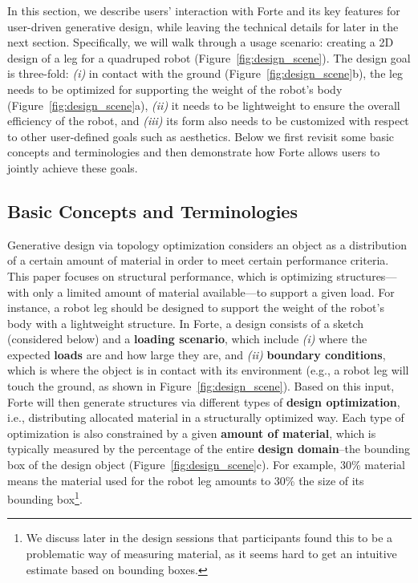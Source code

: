 In this section, we describe users' interaction with Forte and its key features for user-driven generative design, while leaving the technical details for later in the next section. Specifically, we will walk through a usage scenario: creating a 2D design of a leg for a quadruped robot (Figure~\ref{fig:design_scene}). The design goal is three-fold: {\em (i)} in contact with the ground (Figure~\ref{fig:design_scene}b), the leg needs to be optimized for supporting the weight of the robot's body (Figure~\ref{fig:design_scene}a), {\em (ii)} it needs to be lightweight to ensure the overall efficiency of the robot, and {\em (iii)} its form also needs to be customized with respect to other user-defined goals such as aesthetics. Below we first revisit some basic concepts and terminologies and then demonstrate how Forte allows users to jointly achieve these goals.

\subsection{Basic Concepts and Terminologies}
Generative design via topology optimization considers an object as a distribution of a certain amount of material in order to meet certain performance criteria. This paper focuses on structural performance, which is optimizing structures---with only a limited amount of material available---to support a given load. For instance, a robot leg should be designed to support the weight of the robot's body with a lightweight structure. In Forte, a design consists of a sketch (considered below) and a \textbf{loading scenario}, which include {\em(i)} where the expected \textbf{loads} are and how large they are, and {\em(ii)} \textbf{boundary conditions}, which is where the object is in contact with its environment (e.g., a robot leg will touch the ground, as shown in Figure~\ref{fig:design_scene}). Based on this input, Forte will then generate structures via different types of \textbf{design optimization}, i.e., distributing allocated material in a structurally optimized way. Each type of optimization is also constrained by a given \textbf{amount of material}, which is typically measured by the percentage of the entire \textbf{design domain}--the bounding box of the design object (Figure~\ref{fig:design_scene}c). For example, 30\% material means the material used for the robot leg amounts to 30\% the size of its bounding box\footnote{We discuss later in the design sessions that participants found this to be a problematic way of measuring material, as it seems hard to get an intuitive estimate based on bounding boxes.}.

